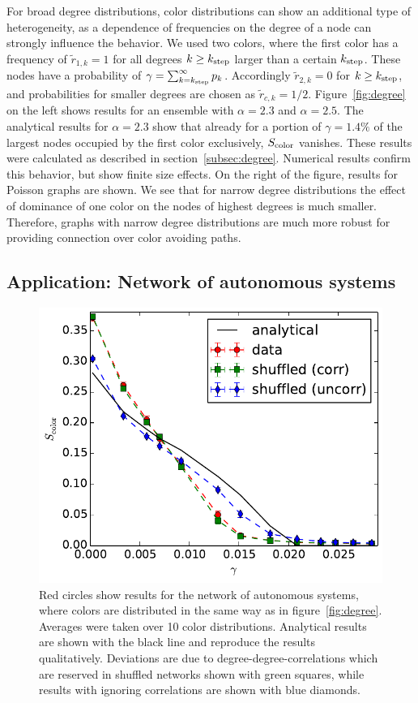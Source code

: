 \documentclass[aps, pre, onecolumn, a4paper, floatfix]{revtex4}
\begin{document}
For broad degree distributions, color distributions can show an additional type of 
heterogeneity, as a dependence of frequencies on the degree of a node can strongly 
influence the behavior. We used two colors, where the first color has a frequency 
of ${\tilde r}_{1,k}=1$ for all degrees $k\geq k_{\rm step}$ larger than a certain 
$k_{\rm step}$. These nodes have a probability of 
$\gamma=\sum_{k=k_{\rm step}}^{\infty} p_k$. Accordingly 
${\tilde r}_{2,k}=0$ for $k\geq k_{\rm step}$, and probabilities for smaller degrees are chosen as 
${\tilde r}_{c,k}=1/2$. Figure~\ref{fig:degree} on the left shows results for an ensemble with 
$\alpha=2.3$ and $\alpha=2.5$. The analytical results for $\alpha=2.3$ show that already for a portion 
of $\gamma=1.4\%$ of the largest nodes occupied by the first color exclusively, $S_{\rm color}$ vanishes. 
These results were calculated as described in section~\ref{subsec:degree}. 
Numerical results confirm this behavior, but show finite size effects. 
On the right of the figure, results for Poisson graphs are shown. We see that for narrow 
degree distributions the effect of dominance of one color on the nodes of highest degrees 
is much smaller. Therefore, graphs with narrow degree distributions are much more robust 
for providing connection over color avoiding paths. 



\subsection{Application: Network of autonomous systems}

\begin{figure}[htb]
\begin{center}
    \includegraphics[width=0.49\columnwidth]{S_color_degree_dependent_data.pdf}
    \caption{Red circles show results for the network of autonomous systems, where colors are 
    distributed in the same way as in figure~\ref{fig:degree}. Averages were taken over 10 color 
    distributions. Analytical results are shown with the black line and reproduce the results qualitatively. 
    Deviations are due to degree-degree-correlations which are reserved in shuffled networks shown 
    with green squares, while results with ignoring correlations are shown with blue diamonds.}
    \label{fig:as}
\end{center}
\end{figure}
\end{document}
